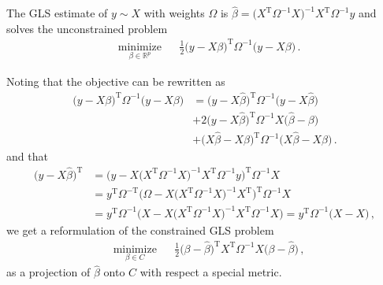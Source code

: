 \documentclass[a4paper]{article}
\newcommand{\real}{\mathbb{R}}
\newcommand{\T}{\mathrm{T}}
\begin{document}
The GLS estimate of $y\sim X$ with weights $\Omega$ is $\hat{\beta} = \bigl(X^\T \Omega^{-1} X
\bigr)^{-1} X^\T \Omega^{-1} y$ and solves the unconstrained problem
\begin{equation} \label{eq:gls_unc}
  \begin{aligned}
    & \underset{\beta\in \real^p}{\text{minimize}}
      & & \tfrac12 \bigl(y - X \beta\bigr)^\T \Omega^{-1} \bigl(y - X \beta\bigr)
          \,.
  \end{aligned}
\end{equation}

Noting that the objective can be rewritten as
\begin{align*}
  \bigl(y - X \beta\bigr)^\T \Omega^{-1} \bigl(y - X \beta\bigr)
    &= \bigl(y - X \hat{\beta}\bigr)^\T \Omega^{-1} \bigl(y - X \hat{\beta}\bigr)
    \\
    &+ 2 \bigl(y - X \hat{\beta}\bigr)^\T \Omega^{-1} X \bigl(\hat{\beta} - \beta\bigr)
    \\
    &+ \bigl(X \hat{\beta} - X \beta\bigr)^\T \Omega^{-1} \bigl(X \hat{\beta} - X \beta\bigr)
    \,.
\end{align*}
and that
\begin{align*}
  \bigl(y - X \hat{\beta}\bigr)^\T
    &= \bigl(y - X \bigl(X^\T \Omega^{-1} X \bigr)^{-1} X^\T \Omega^{-1} y\bigr)^\T \Omega^{-1} X
    \\
    &= y^\T \Omega^{-\T} \bigl(\Omega - X \bigl(X^\T \Omega^{-1} X \bigr)^{-1} X^\T \bigr)^\T \Omega^{-1} X
    \\
    &= y^\T \Omega^{-1} \bigl(X - X \bigl(X^\T \Omega^{-1} X \bigr)^{-1} X^\T \Omega^{-1} X \bigr)
    = y^\T \Omega^{-1} \bigl(X - X\bigr)
    \,,
\end{align*}
we get a reformulation of the constrained GLS problem
\begin{equation} \label{eq:gls_proj}
  \begin{aligned}
    & \underset{\beta\in C}{\text{minimize}}
      & & \tfrac12 \bigl(\beta - \hat{\beta} \bigr)^\T X^\T \Omega^{-1} X \bigl(\beta - \hat{\beta}\bigr)
          \,,
  \end{aligned}
\end{equation}
as a projection of $\hat{\beta}$ onto $C$ with respect a special metric.

\end{document}
